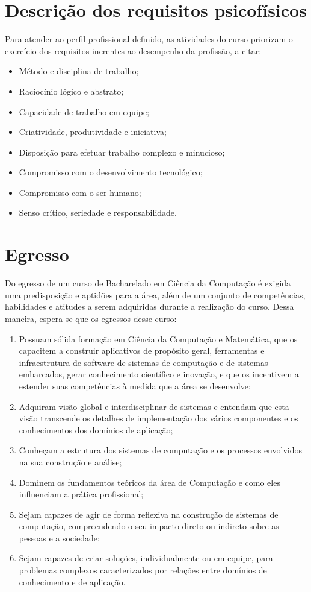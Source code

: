 \documentclass[
	12pt,				%
	openright,			%
  oneside,     %
	a4paper,			%
 hyphens,
	chapter=TITLE,		%
	english,			%
	french,				%
	spanish,			%
	brazil				%
	]{abntex2}
\begin{document}
\section{Descrição dos requisitos psicofísicos}

Para atender ao perfil profissional definido, as atividades do curso priorizam o exercício dos requisitos inerentes ao desempenho da profissão, a citar:

\begin{itemize}
    \item Método e disciplina de trabalho;
    \item Raciocínio lógico e abstrato;
    \item Capacidade de trabalho em equipe;
    \item Criatividade, produtividade e iniciativa;
    \item Disposição para efetuar trabalho complexo e minucioso;
    \item Compromisso com o desenvolvimento tecnológico;
    \item Compromisso com o ser humano;
    \item Senso crítico, seriedade e responsabilidade.
\end{itemize}

\section{Egresso}

Do egresso de um curso de Bacharelado em Ciência da Computação é exigida uma predisposição e aptidões para a área, além de um conjunto de competências, habilidades e atitudes a serem adquiridas durante a realização do curso.  Dessa maneira, espera-se que os egressos desse curso:

\begin{enumerate}
    \item Possuam sólida formação em Ciência da Computação e Matemática, que os capacitem a construir aplicativos de propósito geral, ferramentas e infraestrutura de software de sistemas de computação e de sistemas embarcados, gerar conhecimento científico e inovação, e que os incentivem a estender suas competências à medida que a área se desenvolve;
    \item Adquiram visão global e interdisciplinar de sistemas e entendam que esta visão transcende os detalhes de implementação dos vários componentes e os conhecimentos dos domínios de aplicação;
    \item Conheçam a estrutura dos sistemas de computação e os processos envolvidos na sua construção e análise;
    \item Dominem os fundamentos teóricos da área de Computação e como eles influenciam a prática profissional;
    \item Sejam capazes de agir de forma reflexiva na construção de sistemas de computação, compreendendo o seu impacto direto ou indireto sobre as pessoas e a sociedade;
    \item Sejam capazes de criar soluções, individualmente ou em equipe, para problemas complexos caracterizados por relações entre domínios de conhecimento e de aplicação.
\end{enumerate}
\end{document}
